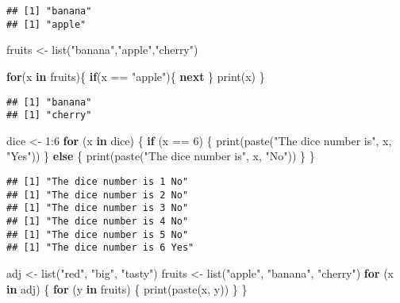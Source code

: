 \documentclass[
]{article}
\newenvironment{Shaded}{\begin{snugshade}}{\end{snugshade}}
\newcommand{\ControlFlowTok}[1]{\textcolor[rgb]{0.13,0.29,0.53}{\textbf{#1}}}
\newcommand{\DecValTok}[1]{\textcolor[rgb]{0.00,0.00,0.81}{#1}}
\newcommand{\FunctionTok}[1]{\textcolor[rgb]{0.00,0.00,0.00}{#1}}
\newcommand{\NormalTok}[1]{#1}
\newcommand{\OtherTok}[1]{\textcolor[rgb]{0.56,0.35,0.01}{#1}}
\newcommand{\SpecialCharTok}[1]{\textcolor[rgb]{0.00,0.00,0.00}{#1}}
\newcommand{\StringTok}[1]{\textcolor[rgb]{0.31,0.60,0.02}{#1}}
\begin{document}
\begin{verbatim}
## [1] "banana"
## [1] "apple"
\end{verbatim}

\begin{Shaded}
\begin{Highlighting}[]
\NormalTok{fruits }\OtherTok{\textless{}{-}} \FunctionTok{list}\NormalTok{(}\StringTok{"banana"}\NormalTok{,}\StringTok{"apple"}\NormalTok{,}\StringTok{"cherry"}\NormalTok{)}

\ControlFlowTok{for}\NormalTok{(x }\ControlFlowTok{in}\NormalTok{ fruits)\{}
  \ControlFlowTok{if}\NormalTok{(x }\SpecialCharTok{==} \StringTok{"apple"}\NormalTok{)\{}
    \ControlFlowTok{next}
\NormalTok{  \}}
  \FunctionTok{print}\NormalTok{(x)}
\NormalTok{\}}
\end{Highlighting}
\end{Shaded}

\begin{verbatim}
## [1] "banana"
## [1] "cherry"
\end{verbatim}

\begin{Shaded}
\begin{Highlighting}[]
\NormalTok{dice }\OtherTok{\textless{}{-}} \DecValTok{1}\SpecialCharTok{:}\DecValTok{6}
\ControlFlowTok{for}\NormalTok{ (x }\ControlFlowTok{in}\NormalTok{ dice) \{ }
  \ControlFlowTok{if}\NormalTok{ (x }\SpecialCharTok{==} \DecValTok{6}\NormalTok{) \{}
    \FunctionTok{print}\NormalTok{(}\FunctionTok{paste}\NormalTok{(}\StringTok{"The dice number is"}\NormalTok{, x, }\StringTok{"Yes"}\NormalTok{)) }
\NormalTok{  \} }\ControlFlowTok{else}\NormalTok{ \{}
    \FunctionTok{print}\NormalTok{(}\FunctionTok{paste}\NormalTok{(}\StringTok{"The dice number is"}\NormalTok{, x, }\StringTok{"No"}\NormalTok{))}
\NormalTok{  \}}
\NormalTok{\}}
\end{Highlighting}
\end{Shaded}

\begin{verbatim}
## [1] "The dice number is 1 No"
## [1] "The dice number is 2 No"
## [1] "The dice number is 3 No"
## [1] "The dice number is 4 No"
## [1] "The dice number is 5 No"
## [1] "The dice number is 6 Yes"
\end{verbatim}

\begin{Shaded}
\begin{Highlighting}[]
\NormalTok{adj }\OtherTok{\textless{}{-}} \FunctionTok{list}\NormalTok{(}\StringTok{"red"}\NormalTok{, }\StringTok{"big"}\NormalTok{, }\StringTok{"tasty"}\NormalTok{) }
\NormalTok{fruits }\OtherTok{\textless{}{-}} \FunctionTok{list}\NormalTok{(}\StringTok{"apple"}\NormalTok{, }\StringTok{"banana"}\NormalTok{, }\StringTok{"cherry"}\NormalTok{) }
\ControlFlowTok{for}\NormalTok{ (x }\ControlFlowTok{in}\NormalTok{ adj) \{ }
  \ControlFlowTok{for}\NormalTok{ (y }\ControlFlowTok{in}\NormalTok{ fruits) \{}
    \FunctionTok{print}\NormalTok{(}\FunctionTok{paste}\NormalTok{(x, y))}
\NormalTok{  \}}
\NormalTok{\}}
\end{Highlighting}
\end{Shaded}
\end{document}
